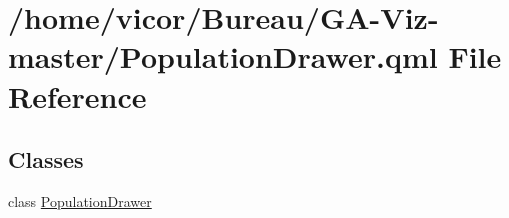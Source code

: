 \hypertarget{_population_drawer_8qml}{}\section{/home/vicor/\+Bureau/\+G\+A-\/\+Viz-\/master/\+Population\+Drawer.qml File Reference}
\label{_population_drawer_8qml}
\subsection*{Classes}
\begin{DoxyCompactItemize}
\item 
class \hyperlink{class_population_drawer}{Population\+Drawer}
\end{DoxyCompactItemize}

